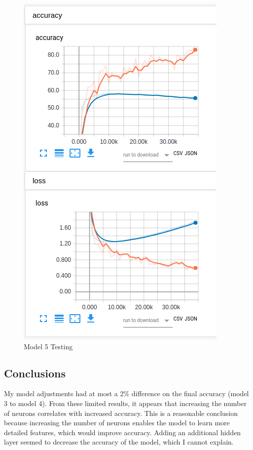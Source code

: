 \documentclass[12pt, letter]{article}
\begin{document}
  \begin{figure}[H]
    \centering
    \includegraphics[width=0.8 \textwidth]{lr1e4hidden4unit128}
    \caption{Model 5 Testing}
    \label{fig:eg}
  \end{figure}

  \subsection{Conclusions}
  My model adjustments had at most a {2\%} difference
  on the final accuracy (model 3 to model 4). From these limited results, it
  appears that increasing the number of neurons correlates with increased
  accuracy. This is a reasonable conclusion because increasing the number of
  neurons enables the model to learn more detailed features, which would improve
  accuracy. Adding an additional hidden layer seemed to decrease the accuracy of
  the model, which I cannot explain.
\end{document}
